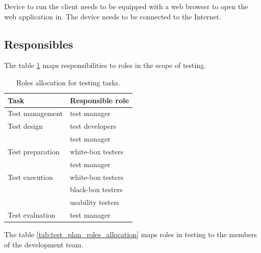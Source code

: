 \documentclass[11pt]{book}
\begin{document}
Device to run the client needs to be equipped with a web browser to open the web application in. The device needs to be connected to the Internet.

\subsection{Responsibles}

The table \ref{tab:test_plan_tasks_allocation} maps responsibilities to roles in the scope of testing.

\begin{table}[H]
	\centering
	\begin{tabular}{| l | l |}
		\hline
		Task 				& Responsible role 	\\ \hline

		Test management 	& test manager 		\\ \hline
		
		Test design 		& test developers 	\\
							& test manager 		\\ \hline
		
		Test preparation 	& white-box testers \\
							& test manager 		\\ \hline
		
		Test execution 		& white-box testers \\
							& black-box testers \\
							& usability testers \\ \hline
		
		Test evaluation 	& test manager 		\\ \hline
	\end{tabular}
	\label{tab:test_plan_tasks_allocation}
	\caption{Roles allocation for testing tasks.}
\end{table}

The table \ref{tab:test_plan_roles_allocation} maps roles in testing to the members of the development team.
\end{document}
